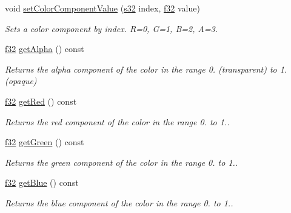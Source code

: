 \begin{DoxyCompactItemize}
\mbox{\label{classirr_1_1video_1_1SColorf_a79c420ed7052d68d3827f455881535af}} 
void \hyperlink{classirr_1_1video_1_1SColorf_a79c420ed7052d68d3827f455881535af}{set\+Color\+Component\+Value} (\hyperlink{namespaceirr_ac66849b7a6ed16e30ebede579f9b47c6}{s32} index, \hyperlink{namespaceirr_a0277be98d67dc26ff93b1a6a1d086b07}{f32} value)
\begin{DoxyCompactList}\small\item\em Sets a color component by index. R=0, G=1, B=2, A=3. \end{DoxyCompactList}\item 
\mbox{\label{classirr_1_1video_1_1SColorf_a9dfa70dda720e7fe81853d703b174f58}} 
\hyperlink{namespaceirr_a0277be98d67dc26ff93b1a6a1d086b07}{f32} \hyperlink{classirr_1_1video_1_1SColorf_a9dfa70dda720e7fe81853d703b174f58}{get\+Alpha} () const
\begin{DoxyCompactList}\small\item\em Returns the alpha component of the color in the range 0. (transparent) to 1. (opaque) \end{DoxyCompactList}\item 
\mbox{\label{classirr_1_1video_1_1SColorf_a1d86f149d93684d94d9f85fd6dad74c5}} 
\hyperlink{namespaceirr_a0277be98d67dc26ff93b1a6a1d086b07}{f32} \hyperlink{classirr_1_1video_1_1SColorf_a1d86f149d93684d94d9f85fd6dad74c5}{get\+Red} () const
\begin{DoxyCompactList}\small\item\em Returns the red component of the color in the range 0. to 1.. \end{DoxyCompactList}\item 
\mbox{\label{classirr_1_1video_1_1SColorf_a514b2e6d07647c8270062c28569c25e2}} 
\hyperlink{namespaceirr_a0277be98d67dc26ff93b1a6a1d086b07}{f32} \hyperlink{classirr_1_1video_1_1SColorf_a514b2e6d07647c8270062c28569c25e2}{get\+Green} () const
\begin{DoxyCompactList}\small\item\em Returns the green component of the color in the range 0. to 1.. \end{DoxyCompactList}\item 
\mbox{\label{classirr_1_1video_1_1SColorf_a769bee9289a9c08d6a8977f562112b95}} 
\hyperlink{namespaceirr_a0277be98d67dc26ff93b1a6a1d086b07}{f32} \hyperlink{classirr_1_1video_1_1SColorf_a769bee9289a9c08d6a8977f562112b95}{get\+Blue} () const
\begin{DoxyCompactList}\small\item\em Returns the blue component of the color in the range 0. to 1.. \end{DoxyCompactList}\end{DoxyCompactItemize}
